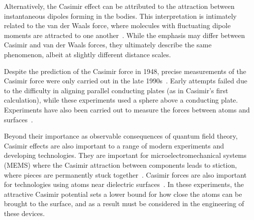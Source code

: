 Alternatively, the Casimir effect can be attributed to the attraction between instantaneous dipoles forming in the bodies.  
This interpretation is intimately related to the van der Waals force, where 
molecules with fluctuating dipole moments are attracted to one another~\cite{vanderWaals}.
While the emphasis may differ between Casimir and van der Waals forces, they ultimately describe the 
same phenomenon, albeit at slightly different distance scales.  

Despite the prediction of the Casimir force in 1948, precise measurements of the Casimir force were only
carried out in the late 1990s~\cite{Lamoreaux1997,Mohideen1998}.  Early attempts failed due to the difficulty
in aligning parallel conducting plates (as in Casimir's first calculation), while these experiments used a
sphere above a conducting plate.  Experiments have also been
carried out to measure the forces between atoms and surfaces~\cite{Sukenik1993,Perreault2005,Harber2005}.

Beyond their importance as observable consequences of quantum field theory, Casimir effects are also 
important to a range of modern experiments and developing technologies.
They are important for microelectromechanical systems (MEMS) where the Casimir attraction between components 
leads to stiction, where pieces are permanently stuck together~\cite{Buks2001}.  
Casimir forces are also important for technologies using atoms near dielectric surfaces~\cite{Folman2000,Alton2011, Hung2013}.
In these experiments, the attractive Casimir potential sets a lower bound for how
close the atoms can be brought to the surface, and as a result must be considered in the engineering 
of these devices.

